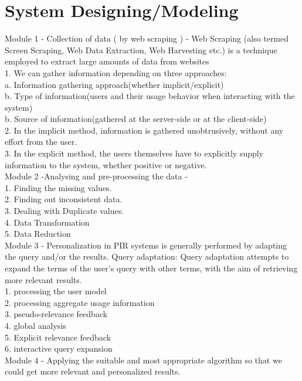 \section{System Designing/Modeling}
Module 1 - Collection of data ( by web scraping ) - Web Scraping (also termed Screen
Scraping, Web Data Extraction, Web Harvesting etc.) is a technique employed to
extract large amounts of data from websites\\
1. We can gather information depending on three approaches:\\
a. Information gathering approach(whether implicit/explicit)\\
b. Type of information(users and their usage behavior when interacting with the system)\\
b. Source of information(gathered at the server-side or at the client-side)\\
2. In the implicit method, information is gathered unobtrusively, without any effort from the
user.\\
3. In the explicit method, the users themselves have to explicitly supply information to the
system, whether positive or negative.\\
Module 2 -Analysing and pre-processing the data -\\
1. Finding the missing values.\\
2. Finding out inconsistent data.\\
3. Dealing with Duplicate values.\\
4. Data Transformation\\
5. Data Reduction\\
Module 3 - Personalization in PIR systems is generally performed by adapting the query
and/or the results. Query adaptation: Query adaptation attempts to expand the terms of
the user’s query with other terms, with the aim of retrieving more relevant results.\\
1. processing the user model\\
2. processing aggregate usage information\\
3. pseudo-relevance feedback\\
4. global analysis\\
5. Explicit relevance feedback\\
6. interactive query expansion\\
Module 4 - Applying the suitable and most appropriate algorithm so that we could get more
relevant and personalized results.\\


